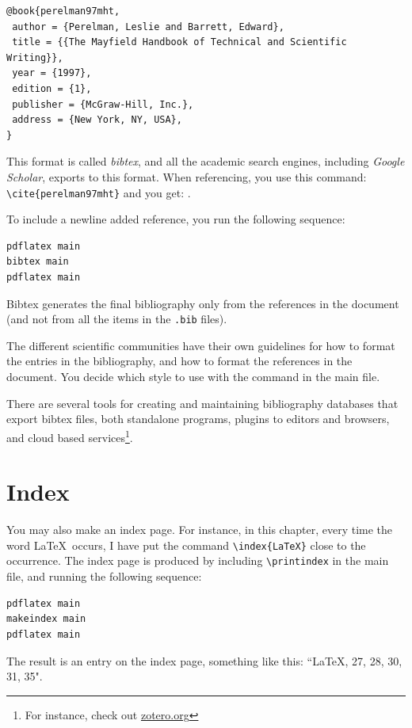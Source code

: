 \begin{lstlisting}[caption=BibTex entry,label=list:bibtex,language=Tex,float=htpb]
 @book{perelman97mht,
 author = {Perelman, Leslie and Barrett, Edward},
 title = {{The Mayfield Handbook of Technical and Scientific Writing}},
 year = {1997},
 edition = {1},
 publisher = {McGraw-Hill, Inc.},
 address = {New York, NY, USA},
} 
\end{lstlisting} 

This format is called  {\em bibtex}, and all the academic search engines, including
 {\em Google Scholar}, exports to this format.
 When referencing, you use this command: \verb|\cite{perelman97mht}|
and you get: \cite{perelman97mht}.
 
 To include a newline added reference, you run the following sequence:
\begin{lstlisting}
pdflatex main
bibtex main
pdflatex main
\end{lstlisting}
Bibtex generates the final bibliography only from the references in the document (and not from all the items in the {\tt .bib} files).

The different scientific communities have their own guidelines for how to format the entries in the bibliography, and how to format the references in the document.
You decide which style to use with the command \verb|| in the main file.

There are several tools for creating and maintaining bibliography databases that export bibtex files, both standalone programs, plugins to editors and browsers, and cloud based services\footnote{For instance, check out \url{zotero.org}}.




\section{Index}

You may also make an index page. For instance, in this chapter, every time the word  \LaTeX\ occurs, I have put the command \verb|\index{LaTeX}| close to the occurrence. The index page is produced by including \verb|\printindex| in the main file, and running the following sequence:
\begin{lstlisting}
pdflatex main
makeindex main
pdflatex main
\end{lstlisting}
The result is an entry on the index page, something like this: ``LaTeX, 27, 28, 30, 31, 35".



